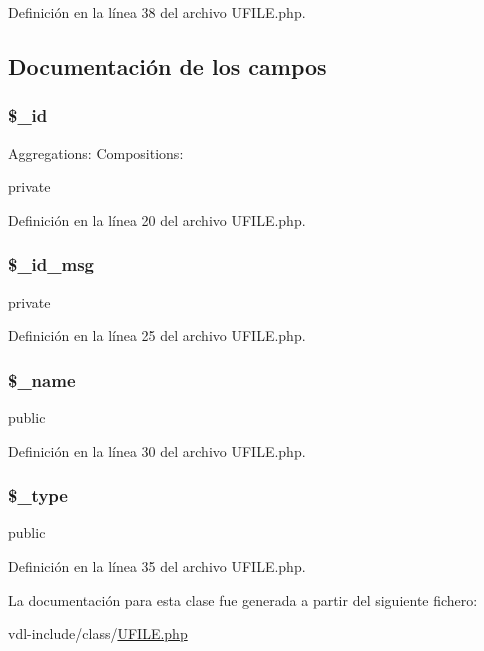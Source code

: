 Definición en la línea 38 del archivo U\-F\-I\-L\-E.\-php.



\subsection{Documentación de los campos}
\hypertarget{classUFILE_a64da16c4a1c7b2dc6784f6ef26341ed7}{
\subsubsection[{\$\-\_\-id}]{\setlength{\rightskip}{0pt plus 5cm}\$\-\_\-id\hspace{0.3cm}{\ttfamily [private]}}}\label{classUFILE_a64da16c4a1c7b2dc6784f6ef26341ed7}
Aggregations\-: Compositions\-:

private 

Definición en la línea 20 del archivo U\-F\-I\-L\-E.\-php.

\hypertarget{classUFILE_a63808e734406ff8eae9fc3dac25fca22}{
\subsubsection[{\$\-\_\-id\-\_\-msg}]{\setlength{\rightskip}{0pt plus 5cm}\$\-\_\-id\-\_\-msg\hspace{0.3cm}{\ttfamily [private]}}}\label{classUFILE_a63808e734406ff8eae9fc3dac25fca22}
private 

Definición en la línea 25 del archivo U\-F\-I\-L\-E.\-php.

\hypertarget{classUFILE_a1c89defaf5aa7ac8e526065e8572f580}{
\subsubsection[{\$\-\_\-name}]{\setlength{\rightskip}{0pt plus 5cm}\$\-\_\-name\hspace{0.3cm}{\ttfamily [private]}}}\label{classUFILE_a1c89defaf5aa7ac8e526065e8572f580}
public 

Definición en la línea 30 del archivo U\-F\-I\-L\-E.\-php.

\hypertarget{classUFILE_a41480551826add2f719e24e0d44b9715}{
\subsubsection[{\$\-\_\-type}]{\setlength{\rightskip}{0pt plus 5cm}\$\-\_\-type\hspace{0.3cm}{\ttfamily [private]}}}\label{classUFILE_a41480551826add2f719e24e0d44b9715}
public 

Definición en la línea 35 del archivo U\-F\-I\-L\-E.\-php.



La documentación para esta clase fue generada a partir del siguiente fichero\-:\begin{DoxyCompactItemize}
\item 
vdl-\/include/class/\hyperlink{UFILE_8php}{U\-F\-I\-L\-E.\-php}\end{DoxyCompactItemize}
